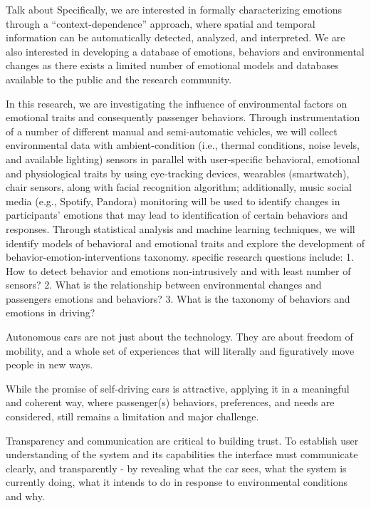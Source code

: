 Talk about 
Specifically, we are interested in formally characterizing emotions through a “context-dependence” approach, where spatial and temporal information can be automatically detected, analyzed, and interpreted. We are also interested in developing a database of  emotions, behaviors and environmental changes as there exists a limited number of emotional models and databases available to the public and the research community.



In this research, we are investigating the influence of environmental factors on emotional traits and consequently passenger behaviors. Through instrumentation of a number of different manual and semi-automatic vehicles, we will collect environmental data with ambient-condition (i.e., thermal conditions, noise levels, and available lighting) sensors in parallel with user-specific behavioral, emotional and physiological traits by using eye-tracking devices, wearables (smartwatch), chair sensors, along with facial recognition algorithm; additionally, music social media (e.g., Spotify, Pandora) monitoring will be used to identify changes in participants’ emotions that may lead to identification of certain behaviors and responses. Through statistical analysis and machine learning techniques, we will identify models of behavioral and emotional traits and explore the development of behavior-emotion-interventions taxonomy.  specific research questions include: 
1.	How to detect behavior and emotions non-intrusively and with least number of sensors?
2.	What is the relationship between environmental changes and passengers emotions and behaviors?
3.	What is the taxonomy of behaviors and emotions in driving?






Autonomous cars are not just about the technology. They are about freedom of mobility, and a whole set of experiences that will literally and figuratively move people in new ways.



While the promise of self-driving cars is attractive, applying it in a meaningful and coherent way, where passenger(s) behaviors, preferences, and needs are considered, still remains a limitation and major challenge.


Transparency and communication are critical to building trust. To establish user understanding of the system and its capabilities the interface must communicate clearly, and transparently - by revealing what the car sees, what the system is currently doing, what it intends to do in response to environmental conditions and why. 




